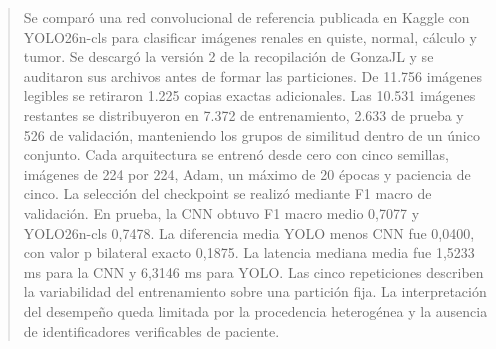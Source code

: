 \begin{abstract}
Se comparó una red convolucional de referencia publicada en Kaggle con YOLO26n-cls para clasificar imágenes renales en quiste, normal, cálculo y tumor. Se descargó la versión 2 de la recopilación de GonzaJL y se auditaron sus archivos antes de formar las particiones. De 11.756 imágenes legibles se retiraron 1.225 copias exactas adicionales. Las 10.531 imágenes restantes se distribuyeron en 7.372 de entrenamiento, 2.633 de prueba y 526 de validación, manteniendo los grupos de similitud dentro de un único conjunto. Cada arquitectura se entrenó desde cero con cinco semillas, imágenes de 224 por 224, Adam, un máximo de 20 épocas y paciencia de cinco. La selección del checkpoint se realizó mediante F1 macro de validación. En prueba, la CNN obtuvo F1 macro medio 0{,}7077 y YOLO26n-cls 0{,}7478. La diferencia media YOLO menos CNN fue 0{,}0400, con valor p bilateral exacto 0{,}1875. La latencia mediana media fue 1{,}5233 ms para la CNN y 6{,}3146 ms para YOLO. Las cinco repeticiones describen la variabilidad del entrenamiento sobre una partición fija. La interpretación del desempeño queda limitada por la procedencia heterogénea y la ausencia de identificadores verificables de paciente.
\end{abstract}
